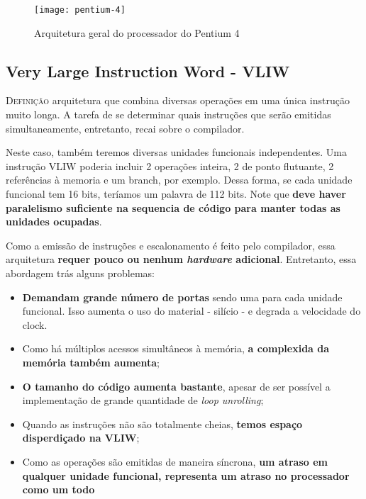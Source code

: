 \begin{figure}[ht]
  \centering
  \texttt{[image: pentium-4]}
  \caption{Arquitetura geral do processador do Pentium 4  }
  \label{fig:pentium4}
\end{figure}


\subsection{Very Large Instruction Word - VLIW}

\textsc{Definição} arquitetura que combina diversas operações em uma única instrução muito longa. A tarefa de se determinar quais instruções que serão emitidas simultaneamente, entretanto, recai sobre o compilador.

Neste caso, também teremos diversas unidades funcionais independentes. Uma instrução VLIW poderia incluir 2 operações inteira, 2 de ponto flutuante, 2 referências à memoria e um branch, por exemplo. Dessa forma, se cada unidade funcional tem 16 bits, teríamos um palavra de 112 bits. Note que \textbf{deve haver paralelismo suficiente na sequencia de código para manter todas as unidades ocupadas}.

Como a emissão de instruções e escalonamento é feito pelo compilador, essa arquitetura \textbf{requer pouco ou nenhum \textit{hardware} adicional}. Entretanto, essa abordagem trás alguns problemas:
\begin{itemize}
  \item \textbf{Demandam grande número de portas} sendo uma para cada unidade funcional. Isso aumenta o uso do material - silício - e degrada a velocidade do clock.

  \item Como há múltiplos acessos simultâneos à memória, \textbf{a complexida da memória também aumenta};

  \item \textbf{O tamanho do código aumenta bastante}, apesar de ser possível a implementação de grande quantidade de \textit{loop unrolling};

  \item Quando as instruções não são totalmente cheias, \textbf{temos espaço disperdiçado na VLIW};

  \item Como as operações são emitidas de maneira síncrona, \textbf{um atraso em qualquer unidade funcional, representa um atraso no processador como um todo}
\end{itemize}





